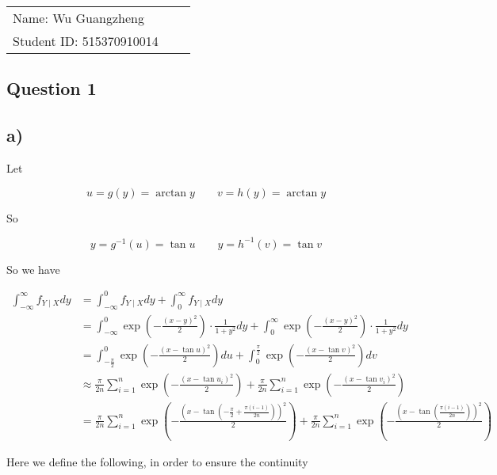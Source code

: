 \documentclass[12pt]{article}
\begin{document}
\vfill
\begin{large}

\begin{table}[h!]
\flushleft
\begin{tabular}{lll}
Name: Wu Guangzheng \hspace*{2em}\\
Student ID: 515370910014

\end{tabular}
\end{table}
\end{large}
\newpage
\begin{flushleft} 

\section{Question 1}

\subsection*{a)}

\qquad Let 

$$
u = g(y) = \arctan y \qquad v = h(y) = \arctan y
$$

\qquad So 

$$
y = g^{-1}(u) = \tan u \qquad y = h^{-1}(v) = \tan v
$$

\qquad So we have

\vspace{-0.5cm}

\begin{align*}
\int_{-\infty}^{\infty}f_{Y\mid X} dy &= \int_{-\infty}^{0} f_{Y\mid X}dy + \int_{0}^{\infty} f_{Y\mid X}dy\\
&= \int_{-\infty}^{0} \exp(-\frac{(x-y)^2}{2})\cdot \frac{1}{1+y^2}dy + \int_{0}^{\infty} \exp(-\frac{(x-y)^2}{2})\cdot \frac{1}{1+y^2}dy\\
&= \int_{-\frac{\pi}{2}}^0 \exp(-\frac{(x-\tan u)^2}{2}) du + \int_{0}^{\frac{\pi}{2}} \exp(-\frac{(x-\tan v)^2}{2}) dv\\
&\approx \frac{\pi}{2n}\sum_{i=1}^n \exp(-\frac{(x - \tan u_i)^2}{2}) + \frac{\pi}{2n}\sum_{i=1}^n \exp(-\frac{(x - \tan v_i)^2}{2})\\
&= \frac{\pi}{2n} \sum_{i=1}^{n} \exp(-\frac{(x-\tan(-\frac{\pi}{2} + \frac{\pi (i-1)}{2n}))^2 }{2}) + \frac{\pi}{2n} \sum_{i=1}^{n} \exp(-\frac{(x-\tan(\frac{\pi (i-1)}{2n}))^2 }{2})
\end{align*}

\qquad Here we define the following, in order to ensure the continuity


\end{flushleft}
\end{document}
